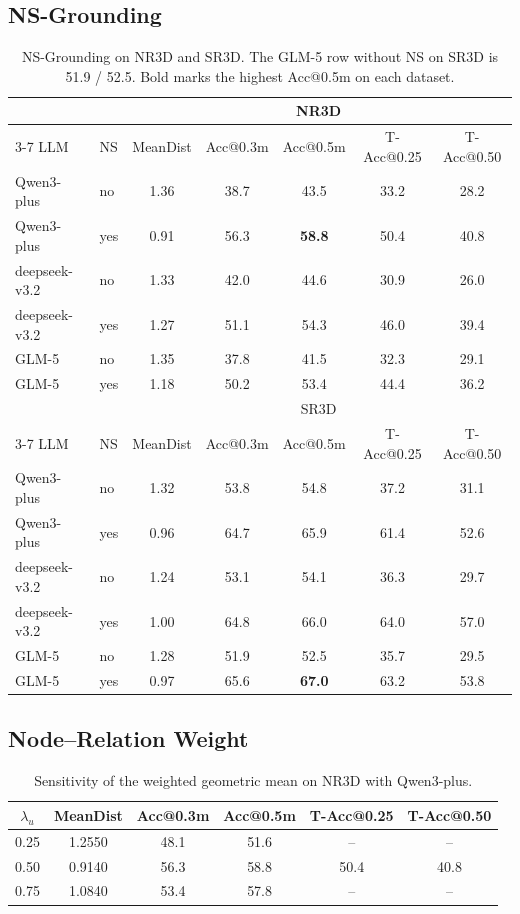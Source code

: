 \documentclass[10pt,letterpaper]{article}
\begin{document}
\subsection{NS-Grounding}
\begin{table}[H]
\centering
\caption{NS-Grounding on NR3D and SR3D.
The GLM-5 row without NS on SR3D is 51.9 / 52.5.
Bold marks the highest Acc@0.5m on each dataset.}
\label{tab:module_ablation}
\setlength{\tabcolsep}{6pt}
\begin{tabular}{llccccc}
\toprule
 & & \multicolumn{5}{c}{NR3D} \\
\cmidrule(lr){3-7}
LLM & NS & MeanDist & Acc@0.3m & Acc@0.5m & T-Acc@0.25 & T-Acc@0.50 \\
\midrule
Qwen3-plus & no & 1.36 & 38.7 & 43.5 & 33.2 & 28.2 \\
Qwen3-plus & yes & 0.91 & 56.3 & \textbf{58.8} & 50.4 & 40.8 \\
deepseek-v3.2 & no & 1.33 & 42.0 & 44.6 & 30.9 & 26.0 \\
deepseek-v3.2 & yes & 1.27 & 51.1 & 54.3 & 46.0 & 39.4 \\
GLM-5 & no & 1.35 & 37.8 & 41.5 & 32.3 & 29.1 \\
GLM-5 & yes & 1.18 & 50.2 & 53.4 & 44.4 & 36.2 \\
\midrule
 & & \multicolumn{5}{c}{SR3D} \\
\cmidrule(lr){3-7}
LLM & NS & MeanDist & Acc@0.3m & Acc@0.5m & T-Acc@0.25 & T-Acc@0.50 \\
\midrule
Qwen3-plus & no & 1.32 & 53.8 & 54.8 & 37.2 & 31.1 \\
Qwen3-plus & yes & 0.96 & 64.7 & 65.9 & 61.4 & 52.6 \\
deepseek-v3.2 & no & 1.24 & 53.1 & 54.1 & 36.3 & 29.7 \\
deepseek-v3.2 & yes & 1.00 & 64.8 & 66.0 & 64.0 & 57.0 \\
GLM-5 & no & 1.28 & 51.9 & 52.5 & 35.7 & 29.5 \\
GLM-5 & yes & 0.97 & 65.6 & \textbf{67.0} & 63.2 & 53.8 \\
\bottomrule
\end{tabular}
\end{table}

\subsection{Node--Relation Weight}
\begin{table}[H]
\centering
\caption{Sensitivity of the weighted geometric mean on NR3D with Qwen3-plus.}
\label{tab:graph_balance}
\begin{tabular}{cccccc}
\toprule
\(\lambda_u\) & MeanDist & Acc@0.3m & Acc@0.5m & T-Acc@0.25 & T-Acc@0.50 \\
\midrule
0.25 & 1.2550 & 48.1 & 51.6 & -- & -- \\
0.50 & 0.9140 & 56.3 & 58.8 & 50.4 & 40.8 \\
0.75 & 1.0840 & 53.4 & 57.8 & -- & -- \\
\bottomrule
\end{tabular}
\end{table}
\end{document}
